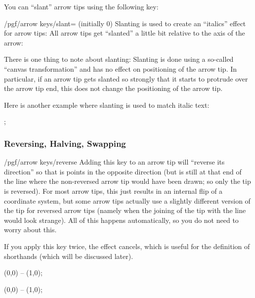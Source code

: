 You can ``slant'' arrow tips using the following key:

\begin{key}{/pgf/arrow keys/slant= (initially 0)}
  Slanting is used to create an ``italics'' effect for arrow tips: All
  arrow tips get ``slanted'' a little bit relative to the axis of the
  arrow:
\begin{codeexample}[]
\end{codeexample}  
  There is one thing to note about slanting: Slanting is done using a
  so-called ``canvas transformation''  and has no effect on
  positioning of the arrow tip. In particular, if an arrow tip gets
  slanted so strongly that it starts to protrude over the arrow tip
  end, this does not change the positioning of the arrow tip.

  Here is another example where slanting is used to match italic text:
\begin{codeexample}[]
\tikz [>={[slant=.3] To[] To[]}]
  ;  
\end{codeexample}
\end{key}



\subsubsection{Reversing, Halving, Swapping}
\label{section-arrow-key-harpoon}

\begin{key}{/pgf/arrow keys/reverse}
  Adding this key to an arrow tip will ``reverse its direction'' so
  that is points in the opposite direction (but is still at that end of the
  line where the non-reversed arrow tip would have been drawn; so only
  the tip is reversed). For most arrow tips, this just results in an
  internal flip of a coordinate system, but some arrow tips actually
  use a slightly different version of the tip for reversed arrow tips
  (namely when the joining of the tip with the line would look
  strange). All of this happens automatically, so you do not need to
  worry about this.

  If you apply this key twice, the effect cancels, which is useful for
  the definition of shorthands (which will be discussed later).
\begin{codeexample}[width=3cm]
 \draw [arrows = {-Stealth[reversed]}] (0,0) -- (1,0);
\end{codeexample}
\begin{codeexample}[width=3cm]
 \draw [arrows = {-Stealth[reversed, reversed]}] (0,0) -- (1,0);
\end{codeexample}
\end{key}

